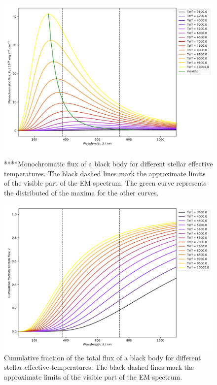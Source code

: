 \documentclass[12pt, a4paper]{report}
\begin{document}
\begin{figure}[h]
\begin{center}
\includegraphics[scale=0.5]{blackbody_teff_illustration.pdf}
\caption{****Monochromatic flux of a black body for different stellar effective temperatures. The black dashed lines mark the approximate limits of the visible part of the EM spectrum. The green curve represents the distributed of the maxima for the other curves.}
\label{planck_curve}

\includegraphics[scale=0.5]{cumulative_blackbody_teff_illustration.pdf}
\caption{Cumulative fraction of the total flux of a black body for different stellar effective temperatures. The black dashed lines mark the approximate limits of the visible part of the EM spectrum.}
\label{cumulative_planck_curve}
\end{center}
\end{figure}
\end{document}
